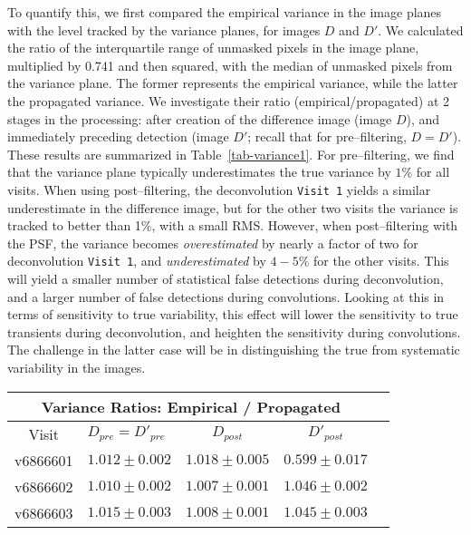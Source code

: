 \documentclass[iop]{emulateapj}
\begin{document}
To quantify this, we first compared the empirical variance in the image planes with the level tracked by the variance planes, for images $D$ and $D'$.
We calculated the ratio of the interquartile range of unmasked pixels in the image plane, multiplied by 0.741 and then squared, with the median of unmasked pixels from the variance plane.
The former represents the empirical variance, while the latter the propagated variance.
We investigate their ratio (empirical/propagated) at 2 stages in the processing: after creation of the difference image (image $D$), and immediately preceding detection (image $D'$; recall that for pre--filtering, $D = D'$).
These results are summarized in Table~\ref{tab-variance1}.
For pre--filtering, we find that the variance plane typically underestimates the true variance by $1\%$ for all visits.
When using post--filtering, the deconvolution {\tt Visit 1} yields a similar underestimate in the difference image, but for the other two visits the variance is tracked to better than 1\%, with a small RMS.
However, when post--filtering with the PSF, the variance becomes {\it overestimated} by nearly a factor of two for deconvolution {\tt Visit 1}, and {\it underestimated} by $4-5\%$ for the other visits.
This will yield a smaller number of statistical false detections during deconvolution, and a larger number of false detections during convolutions.
Looking at this in terms of sensitivity to true variability, this effect will lower the sensitivity to true transients during deconvolution, and heighten the sensitivity during convolutions.
The challenge in the latter case will be in distinguishing the true from systematic variability in the images.

\begin{table*}[t]
\centering
\begin{tabular}{clccc}
\hline
\multicolumn{4}{|c|}{Variance Ratios: Empirical / Propagated} \\
\hline
Visit    & $D_{pre} = D'_{pre}$ & $D_{post}$ & $D'_{post}$ \\
\hline
v6866601 &$1.012 \pm 0.002$&$1.018 \pm 0.005$&$0.599 \pm 0.017$ \\
v6866602 &$1.010 \pm 0.002$&$1.007 \pm 0.001$&$1.046 \pm 0.002$ \\
v6866603 &$1.015 \pm 0.003$&$1.008 \pm 0.001$&$1.045 \pm 0.003$ \\
\end{tabular}
\caption{{\rm Ratio of the empirical variance in the difference images, calculated using the square of (0.741 times the interquartile range), to the median of the variance plane.
  In all cases (except the deconvolution configuration) the variance plane represents an {\it underestimate} of the true variance in the images.
  We report the mean and RMS across all sensors.
\label{tab-variance1}}}
\end{table*}
\end{document}
